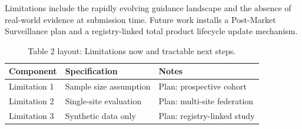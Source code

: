 
Limitations include the rapidly evolving guidance landscape and the absence of real-world evidence at submission time. Future work installs a Post-Market Surveillance plan and a registry-linked total product lifecycle update mechanism.

\begin{table}[H]
\caption{Table 2 layout: Limitations now and tractable next steps.}
\label{tab:limits_future}
\centering
\begin{tabular}{>{\raggedright\arraybackslash}p{3.4cm} >{\raggedright\arraybackslash}p{4.6cm} >{\raggedright\arraybackslash}p{5.4cm}}
\toprule
\textbf{Component} & \textbf{Specification} & \textbf{Notes} \\
\midrule
  Limitation 1 & Sample size assumption & Plan: prospective cohort \\
  Limitation 2 & Single-site evaluation & Plan: multi-site federation \\
  Limitation 3 & Synthetic data only & Plan: registry-linked study \\
\bottomrule
\end{tabular}
\end{table}
